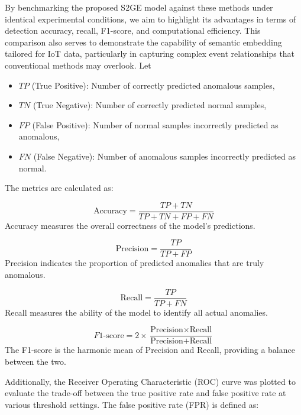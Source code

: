 \begin{ZhChapter}
    By benchmarking the proposed S2GE model against these methods under identical experimental conditions, we aim to highlight its advantages in terms of detection accuracy, recall, F1-score, and computational efficiency. This comparison also serves to demonstrate the capability of semantic embedding tailored for IoT data, particularly in capturing complex event relationships that conventional methods may overlook.
    Let
    \begin{itemize}
        \item $TP$ (True Positive): Number of correctly predicted anomalous samples,
        \item $TN$ (True Negative): Number of correctly predicted normal samples,
        \item $FP$ (False Positive): Number of normal samples incorrectly predicted as anomalous,
        \item $FN$ (False Negative): Number of anomalous samples incorrectly predicted as normal.
    \end{itemize}

    The metrics are calculated as:

    \begin{equation}
        \text{Accuracy} = \frac{TP + TN}{TP + TN + FP + FN}
    \end{equation}
    Accuracy measures the overall correctness of the model's predictions.

    \begin{equation}
        \text{Precision} = \frac{TP}{TP + FP}
    \end{equation}
    Precision indicates the proportion of predicted anomalies that are truly anomalous.

    \begin{equation}
        \text{Recall} = \frac{TP}{TP + FN}
    \end{equation}
    Recall measures the ability of the model to identify all actual anomalies.

    \begin{equation}
        F1\text{-score} = 2 \times \frac{\text{Precision} \times \text{Recall}}{\text{Precision} + \text{Recall}}
    \end{equation}
    The F1-score is the harmonic mean of Precision and Recall, providing a balance between the two.

    Additionally, the Receiver Operating Characteristic (ROC) curve was plotted to evaluate the trade-off between the true positive rate and false positive rate at various threshold settings. The false positive rate (FPR) is defined as:


\end{ZhChapter}
